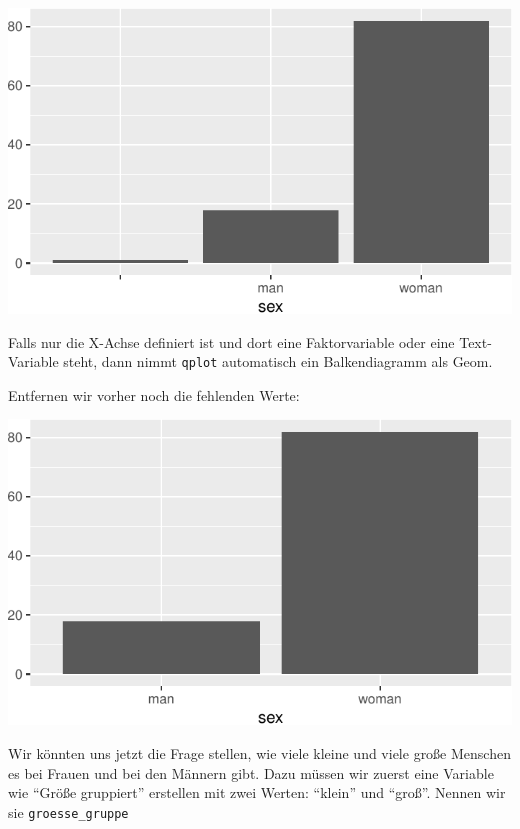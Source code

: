 \documentclass[12pt,ngerman,paper=a4,pagesize,DIV=13]{scrreprt}
\newenvironment{Shaded}{\begin{snugshade}}{\end{snugshade}}
\newcommand{\DataTypeTok}[1]{\textcolor[rgb]{0.13,0.29,0.53}{#1}}
\newcommand{\KeywordTok}[1]{\textcolor[rgb]{0.13,0.29,0.53}{\textbf{#1}}}
\newcommand{\NormalTok}[1]{#1}
\newcommand{\OperatorTok}[1]{\textcolor[rgb]{0.81,0.36,0.00}{\textbf{#1}}}
\newcommand{\StringTok}[1]{\textcolor[rgb]{0.31,0.60,0.02}{#1}}
\begin{document}
\includegraphics{DatenerhebungStatistik-Uebung_files/figure-latex/unnamed-chunk-250-1.pdf}

Falls nur die X-Achse definiert ist und dort eine Faktorvariable oder
eine Text-Variable steht, dann nimmt \texttt{qplot} automatisch ein
Balkendiagramm als Geom.

Entfernen wir vorher noch die fehlenden Werte:

\begin{Shaded}
\end{Shaded}

\includegraphics{DatenerhebungStatistik-Uebung_files/figure-latex/unnamed-chunk-251-1.pdf}

Wir könnten uns jetzt die Frage stellen, wie viele kleine und viele
große Menschen es bei Frauen und bei den Männern gibt. Dazu müssen wir
zuerst eine Variable wie \enquote{Größe gruppiert} erstellen mit zwei
Werten: \enquote{klein} und \enquote{groß}. Nennen wir sie
\texttt{groesse\_gruppe}
\end{document}
